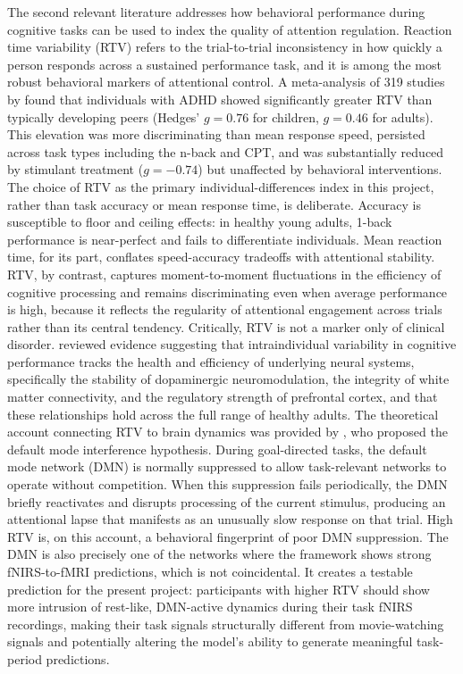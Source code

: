 The second relevant literature addresses how behavioral performance during cognitive
tasks can be used to index the quality of attention regulation. Reaction time variability
(RTV) refers to the trial-to-trial inconsistency in how quickly a person responds across
a sustained performance task, and it is among the most robust behavioral markers of
attentional control. A meta-analysis of 319 studies by \textcite{kofler2013} found that
individuals with ADHD showed significantly greater RTV than typically developing peers
(Hedges' $g = 0.76$ for children, $g = 0.46$ for adults). This elevation was more
discriminating than mean response speed, persisted across task types including the n-back
and CPT, and was substantially reduced by stimulant treatment ($g = -0.74$) but
unaffected by behavioral interventions. The choice of RTV as the primary
individual-differences index in this project, rather than task accuracy or mean response
time, is deliberate. Accuracy is susceptible to floor and ceiling effects: in healthy
young adults, 1-back performance is near-perfect and fails to differentiate individuals.
Mean reaction time, for its part, conflates speed-accuracy tradeoffs with attentional
stability. RTV, by contrast, captures moment-to-moment fluctuations in the efficiency
of cognitive processing and remains discriminating even when average performance is high,
because it reflects the regularity of attentional engagement across trials rather than
its central tendency. Critically, RTV is not a marker only of clinical disorder.
\textcite{macdonald2009} reviewed evidence suggesting that intraindividual variability
in cognitive performance tracks the health and efficiency of underlying neural systems,
specifically the stability of dopaminergic neuromodulation, the integrity of white matter
connectivity, and the regulatory strength of prefrontal cortex, and that these
relationships hold across the full range of healthy adults. The theoretical account
connecting RTV to brain dynamics was provided by \textcite{sonugabarke2007}, who
proposed the default mode interference hypothesis. During goal-directed tasks, the
default mode network (DMN) is normally suppressed to allow task-relevant networks to
operate without competition. When this suppression fails periodically, the DMN briefly
reactivates and disrupts processing of the current stimulus, producing an attentional
lapse that manifests as an unusually slow response on that trial. High RTV is, on this
account, a behavioral fingerprint of poor DMN suppression. The DMN is also precisely
one of the networks where the \textcite{gao2025} framework shows strong fNIRS-to-fMRI
predictions, which is not coincidental. It creates a testable prediction for the present
project: participants with higher RTV should show more intrusion of rest-like, DMN-active
dynamics during their task fNIRS recordings, making their task signals structurally
different from movie-watching signals and potentially altering the model's ability to
generate meaningful task-period predictions.

